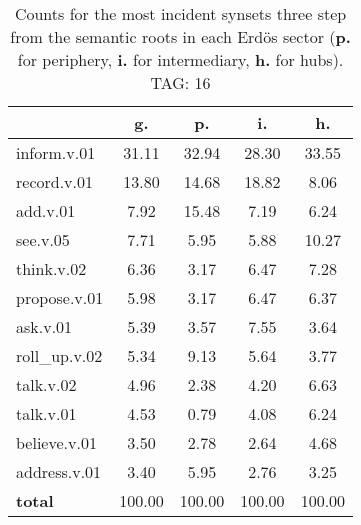 \begin{table}[h!]
\begin{center}
\begin{tabular}{| l || c | c | c | c |}\hline
 & {\bf g.} & {\bf p.} & {\bf i.} & {\bf h.} \\\hline\hline
inform.v.01 & 31.11  & 32.94  & 28.30  & 33.55 \\\hline
record.v.01 & 13.80  & 14.68  & 18.82  & 8.06 \\\hline
add.v.01 & 7.92  & 15.48  & 7.19  & 6.24 \\\hline
see.v.05 & 7.71  & 5.95  & 5.88  & 10.27 \\\hline
think.v.02 & 6.36  & 3.17  & 6.47  & 7.28 \\\hline
propose.v.01 & 5.98  & 3.17  & 6.47  & 6.37 \\\hline
ask.v.01 & 5.39  & 3.57  & 7.55  & 3.64 \\\hline
roll\_up.v.02 & 5.34  & 9.13  & 5.64  & 3.77 \\\hline
talk.v.02 & 4.96  & 2.38  & 4.20  & 6.63 \\\hline
talk.v.01 & 4.53  & 0.79  & 4.08  & 6.24 \\\hline
believe.v.01 & 3.50  & 2.78  & 2.64  & 4.68 \\\hline
address.v.01 & 3.40  & 5.95  & 2.76  & 3.25 \\\hline\hline
{{\bf total}} & 100.00  & 100.00  & 100.00  & 100.00 \\\hline
\end{tabular}
\caption{Counts for the most incident synsets three step from the semantic roots in each Erd\"os sector ({\bf p.} for periphery, {\bf i.} for intermediary, {\bf h.} for hubs). TAG: 16}
\end{center}
\end{table}